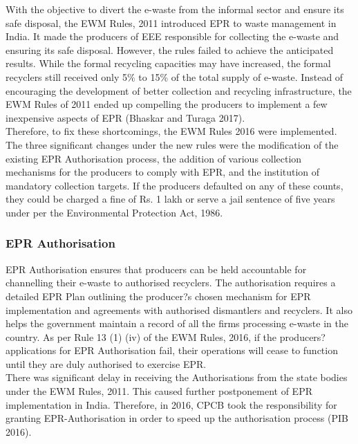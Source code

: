 \documentclass[a4paper, 12pt]{article}
\begin{document}
                    With the objective to divert the e-waste from the informal sector and ensure its safe disposal, the EWM Rules, 2011 introduced EPR to waste management in India. It made the producers of EEE responsible for collecting the e-waste and ensuring its safe disposal. 
                    However, the rules failed to achieve the anticipated results. While the formal recycling capacities may have increased, the formal recyclers still received only 5\% to 15\% of the total supply of e-waste. Instead of encouraging the development of better collection and recycling infrastructure, the EWM Rules of 2011 ended up compelling the producers to implement a few inexpensive aspects of EPR (Bhaskar and Turaga 2017). \\
                    
                    Therefore, to fix these shortcomings, the EWM Rules 2016 were implemented. The three significant changes under the new rules were the modification of the existing EPR Authorisation process, the addition of various collection mechanisms for the producers to comply with EPR, and the institution of mandatory collection targets. If the producers defaulted on any of these counts, they could be charged a fine of Rs. 1 lakh or serve a jail sentence of five years under per the Environmental Protection Act, 1986. \\
                    
                    \subsubsection{EPR Authorisation}
                    
                    EPR Authorisation ensures that producers can be held accountable for channelling their e-waste to authorised recyclers. The authorisation requires a detailed EPR Plan outlining the producer?s chosen mechanism for EPR implementation and agreements with authorised dismantlers and recyclers. It also helps the government maintain a record of all the firms processing e-waste in the country. As per Rule 13 (1) (iv) of the EWM Rules, 2016, if the producers? applications for EPR Authorisation fail, their operations will cease to function until they are duly authorised to exercise EPR.\\
                     
                    There was significant delay in receiving the Authorisations from the state bodies under the EWM Rules, 2011. This caused further postponement of EPR implementation in India. Therefore, in 2016, CPCB took the responsibility for granting EPR-Authorisation in order to speed up the authorisation process (PIB 2016). \\
                    
\end{document}
